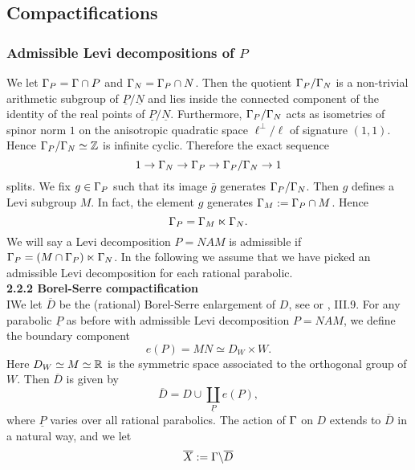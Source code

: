 \subsection{Compactifications}



\subsubsection{Admissible Levi decompositions of $P$}

We let $\Gamma_P = \Gamma \cap P$ and $\Gamma_N = \Gamma_P \cap N$. Then the quotient $\Gamma_P/\Gamma_N$ is a non-trivial arithmetic subgroup of $\underline{P}/\underline{N}$ and lies inside the connected component of the identity of the real points of $\underline{P}/\underline{N}$. Furthermore, $\Gamma_P/\Gamma_N$ acts as isometries of spinor norm $1$ on the anisotropic quadratic space $\ell^{\perp}/\ell$  of signature $(1,1)$. Hence $\Gamma_P/\Gamma_N \simeq \mathbb{Z}$ is infinite cyclic. Therefore the exact sequence 
\begin{equation*} \label{exactsequence}
1 \to \Gamma_N \to \Gamma_P \to \Gamma_P/\Gamma_N \to 1
\end{equation*}
splits. We fix $g \in \Gamma_P$ such that its image $\bar{g}$ generates $\Gamma_P/\Gamma_N$. Then $g$ defines a Levi subgroup $M$. In fact, the element $g$ generates $\Gamma_M :=\Gamma_P \cap M$. Hence
\[
\Gamma_P = \Gamma_M \ltimes \Gamma_N.
\]
We will say a Levi decomposition $P = NAM$ is admissible if $
\Gamma_P = (M \cap \Gamma_P) \ltimes \Gamma_N$. In the following we assume that we have picked an admissible Levi decomposition for each rational parabolic.
\\[12pt] 
\textbf{2.2.2 Borel-Serre compactification} 
\\[10pt]
IWe let $\overline{D}$ be the (rational) Borel-Serre enlargement of $D$, see \cite{BorelSerre} or \cite{BJ}, III.9. For any parabolic $\underline{P}$ as before with admissible Levi decomposition $P=NAM$, we define the boundary component
\begin{equation*}
e({P}) = MN \simeq D_W \times W.
\end{equation*}
Here $D_W \simeq M \simeq \mathbb{R}$ is the symmetric space associated to the orthogonal group of $W$. Then $\overline{D}$ is given by 
\begin{equation*}
\overline{D} = D \cup \coprod_{\underline{P}} e({P}),
\end{equation*}
where $\underline{P}$ varies over all rational parabolics. The action of $\Gamma$ on $D$ extends to $\overline{D}$ in a natural way, and we let 
\begin{equation*}
\overline{X}:= \Gamma \backslash \overline{D}
\end{equation*}
